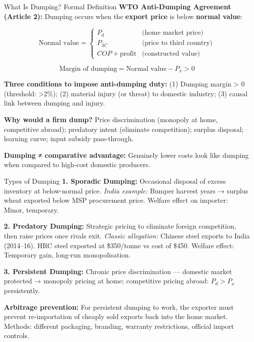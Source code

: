 \documentclass[
  ignorenonframetext,
  aspectratio=169,
]{beamer}
\makeatletter
\let\quarto@originallabel\label
\DeclareRobustCommand*{\label}[1]{\quarto@originallabel{#1}}
\makeatother
\begin{document}
\begin{frame}{What Is Dumping? Formal Definition}
\label{what-is-dumping-formal-definition}
\textbf{WTO Anti-Dumping Agreement (Article 2):} Dumping occurs when the
\textbf{export price} is below \textbf{normal value}:

\[\text{Normal value} = \begin{cases} P_d & \text{(home market price)} \\ P_{3C} & \text{(price to third country)} \\ COP + \text{profit} & \text{(constructed value)} \end{cases}\]

\[\text{Margin of dumping} = \text{Normal value} - P_x > 0\]

\textbf{Three conditions to impose anti-dumping duty:} (1) Dumping
margin \textgreater{} 0 (threshold: \textgreater2\%); (2) material
injury (or threat) to domestic industry; (3) causal link between dumping
and injury.

\textbf{Why would a firm dump?} Price discrimination (monopoly at home,
competitive abroad); predatory intent (eliminate competition); surplus
disposal; learning curve; input subsidy pass-through.

\textbf{Dumping ≠ comparative advantage:} Genuinely lower costs look
like dumping when compared to high-cost domestic producers.
\end{frame}

\begin{frame}{Types of Dumping}
\label{types-of-dumping}
\textbf{1. Sporadic Dumping:} Occasional disposal of excess inventory at
below-normal price. \emph{India example:} Bumper harvest years → surplus
wheat exported below MSP procurement price. Welfare effect on importer:
Minor, temporary.

\textbf{2. Predatory Dumping:} Strategic pricing to eliminate foreign
competition, then raise prices once rivals exit. \emph{Classic
allegation:} Chinese steel exports to India (2014--16). HRC steel
exported at \$350/tonne vs cost of \$450. Welfare effect: Temporary
gain, long-run monopolisation.

\textbf{3. Persistent Dumping:} Chronic price discrimination ---
domestic market protected → monopoly pricing at home; competitive
pricing abroad: \(P_d > P_x\) persistently.

\textbf{Arbitrage prevention:} For persistent dumping to work, the
exporter must prevent re-importation of cheaply sold exports back into
the home market. Methods: different packaging, branding, warranty
restrictions, official import controls.
\end{frame}
\end{document}
